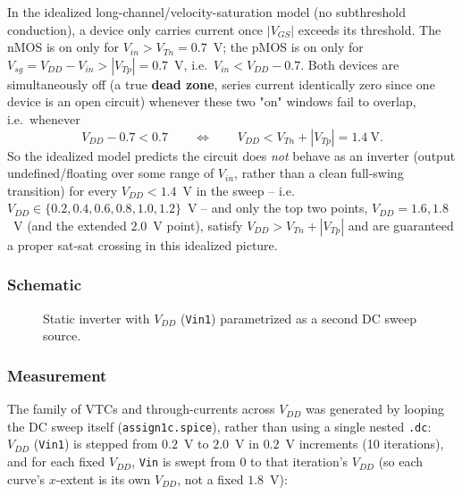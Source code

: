In the idealized long-channel/velocity-saturation model (no subthreshold
conduction), a device only carries current once $|V_{GS}|$ exceeds its
threshold. The nMOS is on only for $V_{in}>V_{Tn}=0.7$~V; the pMOS is on only
for $V_{sg}=V_{DD}-V_{in}>|V_{Tp}|=0.7$~V, i.e.\ $V_{in}<V_{DD}-0.7$. Both
devices are simultaneously off (a true \textbf{dead zone}, series current
identically zero since one device is an open circuit) whenever these two "on"
windows fail to overlap, i.e.\ whenever
\[
V_{DD} - 0.7 < 0.7 \qquad\Longleftrightarrow\qquad V_{DD} < V_{Tn}+|V_{Tp}| =
1.4\ \text{V}.
\]
So the idealized model predicts the circuit does \emph{not} behave as an
inverter (output undefined/floating over some range of $V_{in}$, rather than a
clean full-swing transition) for every $V_{DD}<1.4$~V in the sweep --
i.e.\ $V_{DD}\in\{0.2,0.4,0.6,0.8,1.0,1.2\}$~V -- and only the top two points,
$V_{DD}=1.6,1.8$~V (and the extended $2.0$~V point), satisfy
$V_{DD}>V_{Tn}+|V_{Tp}|$ and are guaranteed a proper sat-sat crossing in this
idealized picture.

\subsubsection{Schematic}

\begin{figure}[h]
  \centering
  \caption{Static inverter with $V_{DD}$ (\texttt{Vin1}) parametrized as a
  second DC sweep source.}
  \label{fig:1c-schematic}
\end{figure}

\subsubsection{Measurement}

The family of VTCs and through-currents across $V_{DD}$ was generated by looping
the DC sweep itself (\texttt{assign1c.spice}), rather than using a single nested
\texttt{.dc}: $V_{DD}$ (\texttt{Vin1}) is stepped from $0.2$~V to $2.0$~V in
$0.2$~V increments (10 iterations), and for each fixed $V_{DD}$, \texttt{Vin} is
swept from $0$ to that iteration's $V_{DD}$ (so each curve's $x$-extent is its
own $V_{DD}$, not a fixed $1.8$~V):

